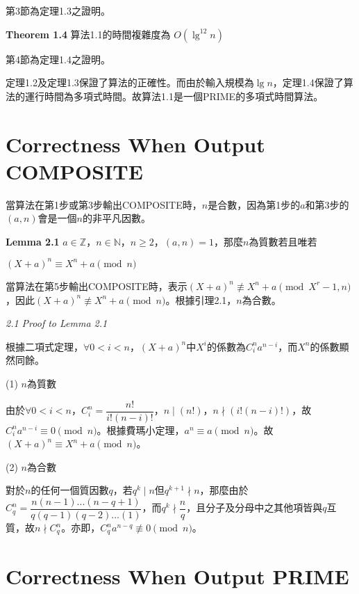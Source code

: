 \documentclass{article}
\newcommand{\nequiv}{\not\equiv}
\begin{document}
    第3節為定理1.3之證明。

\begin{mdframed}
\noindent\textbf{Theorem 1.4} 算法1.1的時間複雜度為 \(O(\lg^{12}n)\)
\end{mdframed}
    
    第4節為定理1.4之證明。

    定理1.2及定理1.3保證了算法的正確性。而由於輸入規模為$\lg n$，定理1.4保證了算法的運行時間為多項式時間。故算法1.1是一個PRIME的多項式時間算法。

\section{Correctness When Output COMPOSITE}

    當算法在第1步或第3步輸出COMPOSITE時，$n$是合數，因為第1步的$a$和第3步的$(a,n)$會是一個$n$的非平凡因數。

\begin{mdframed}
\noindent\textbf{Lemma 2.1} $a\in\mathbb{Z}$，$n\in\mathbb{N}$，$n\geq 2$，$(a,n)=1$，那麼$n$為質數若且唯若\\
    \centerline{$(X+a)^n\equiv X^n+a \pmod{n}$}
\end{mdframed}

    當算法在第5步輸出COMPOSITE時，表示$(X+a)^n\nequiv X^n+a \pmod{X^r-1, n}$，因此$(X+a)^n\nequiv X^n+a \pmod{n}$。根據引理2.1，$n$為合數。

\noindent\textit{2.1 Proof to Lemma 2.1} 

    根據二項式定理，$\forall 0<i<n$，$(X+a)^n$中$X^i$的係數為$C^n_ia^{n-i}$，而$X^n$的係數顯然同餘。

    \noindent (1) $n$為質數
    
        由於$\forall 0<i<n$，$C^n_i=\dfrac{n!}{i!(n-i)!}$，$n\mid(n!)$，$n\nmid(i!(n-i)!)$，故$C^n_ia^{n-i}\equiv 0\pmod{n}$。根據費瑪小定理，$a^n\equiv a\pmod{n}$。故$(X+a)^n\equiv X^n+a \pmod{n}$。

    \noindent (2) $n$為合數

        對於$n$的任何一個質因數$q$，若$q^k\mid n$但$q^{k+1}\nmid n$，那麼由於$C^n_q=\dfrac{n(n-1)...(n-q+1)}{q(q-1)(q-2)...(1)}$，而$q^k\nmid\dfrac{n}{q}$，且分子及分母中之其他項皆與$q$互質，故$n\nmid C^n_q$。亦即，$C^n_qa^{n-q}\not\equiv 0\pmod{n}$。

\section{Correctness When Output PRIME}
\end{document}
